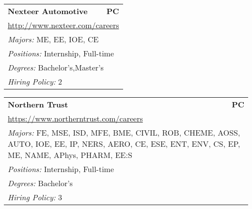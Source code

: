 \documentclass[twoside]{article}
\begin{document}
\begin{center}
\begin{multicols}{3}
\begin{FlushLeft}
\begin{minipage}{\columnwidth}
\end{minipage}
 
\begin{minipage}{\columnwidth}\begin{tabularx}{.95\columnwidth}{Xr}
                 {\Large\bf Nexteer Automotive} & {\Large\bf PC}\\
    \multicolumn{2}{p{.95\columnwidth}}{\url{http://www.nexteer.com/careers}}\\
    \multicolumn{2}{p{.95\columnwidth}}{\emph{Majors:} ME, EE, IOE, CE}\\
    \multicolumn{2}{p{.95\columnwidth}}{\emph{Positions:} Internship, Full-time}\\
    \multicolumn{2}{p{.95\columnwidth}}{\emph{Degrees:} Bachelor's,Master's}\\
    \multicolumn{2}{p{.95\columnwidth}}{\emph{Hiring Policy:} 2}\\
    \end{tabularx}
    
\end{minipage}
 
\begin{minipage}{\columnwidth}\begin{tabularx}{.95\columnwidth}{Xr}
                 {\Large\bf Northern Trust} & {\Large\bf PC}\\
    \multicolumn{2}{p{.95\columnwidth}}{\url{https://www.northerntrust.com/careers}}\\
    \multicolumn{2}{p{.95\columnwidth}}{\emph{Majors:} FE, MSE, ISD, MFE, BME, CIVIL, ROB, CHEME, AOSS, AUTO, IOE, EE, IP, NERS, AERO, CE, ESE, ENT, ENV, CS, EP, ME, NAME, APhys, PHARM, EE:S}\\
    \multicolumn{2}{p{.95\columnwidth}}{\emph{Positions:} Internship, Full-time}\\
    \multicolumn{2}{p{.95\columnwidth}}{\emph{Degrees:} Bachelor's}\\
    \multicolumn{2}{p{.95\columnwidth}}{\emph{Hiring Policy:} 3}\\
    \end{tabularx}
    
\end{minipage}
 

\end{FlushLeft}
\end{multicols}
\end{center}
\end{document}
